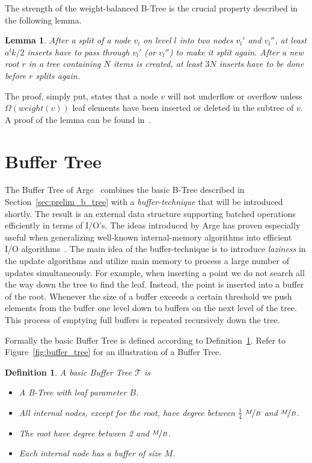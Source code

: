 \documentclass[twoside,11pt,openright]{report}
\newtheorem{definition}{Definition}
\newtheorem{lemma}{Lemma}
\begin{document}
The strength of the weight-balanced B-Tree is the crucial property described in the following lemma.

\begin{lemma}
\label{lma:weight_balanced}
After a split of a node $v_l$ on level $l$ into two nodes $v_l'$ and $v_l''$, at least $a^lk/2$ inserts have to pass through $v_l'$ (or $v_l''$) to make it split again. After a new root $r$ in a tree containing $N$ items is created, at least $3N$ inserts have to be done before $r$ splits again.
\end{lemma}

The proof, simply put, states that a node $v$ will not underflow or overflow unless $\Omega(weight(v))$ leaf elements have been inserted or deleted in the subtree of $v$. A proof of the lemma can be found in~\cite{arge_vitter_1996}.
\clearpage
\section{Buffer Tree}
\label{sec:prelim_buffer_tree}
The Buffer Tree of Arge~\cite{Arge:1995:BTN:645930.672850} combines the basic B-Tree described in Section~\ref{sec:prelim_b_tree} with a \textit{buffer-technique} that will be introduced shortly. The result is an external data structure supporting batched operations efficiently in terms of I/O's. The ideas introduced by Arge has proven especially useful when generalizing well-known internal-memory algorithms into efficient I/O algorithms~\cite{Arge:1995:BTN:645930.672850}. The main idea of the buffer-technique is to introduce \textit{laziness} in the update algorithms and utilize main memory to process a large number of updates simultaneously. For example, when inserting a point we do not search all the way down the tree to find the leaf. Instead, the point is inserted into a buffer of the root. Whenever the size of a buffer exceeds a certain threshold we push elements from the buffer one level down to buffers on the next level of the tree. This process of emptying full buffers is repeated recursively down the tree.

Formally the basic Buffer Tree is defined according to Definition~\ref{def:buffer_tree}. Refer to Figure~\ref{fig:buffer_tree} for an illustration of a Buffer Tree.

\begin{definition}
\label{def:buffer_tree}
A basic Buffer Tree $\mathcal{T}$ is
\begin{itemize}
	\item A B-Tree with leaf parameter $B$.
	\item All internal nodes, except for the root, have degree between $\frac{1}{4}$ $\nicefrac{M}{B}$ and $\nicefrac{M}{B}$.
	\item The root have degree between 2 and $\nicefrac{M}{B}$.
	\item Each internal node has a buffer of size $M$.
\end{itemize}
\end{definition}
\end{document}
